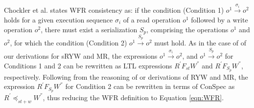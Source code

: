 \documentclass[acmlarge, ,11pt]{acmart}
\begin{document}
\par  Chockler et al. states WFR consistency as: if the condition (Condition 1)
  $\mathit{o}^1 \xrightarrow{\sigma_i} \mathit{o}^2$ holds for a given execution sequence $\sigma_i$ of a read operation
   $\mathit{o}^1$ followed by a write operation  $\mathit{o}^2$, there must exist a serialization ${S_p}$, comprising the
   operations $\mathit{o}^1$ and $\mathit{o}^2$, for which the condition (Condition 2)
  $\mathit{o}^1 \xrightarrow{S_p} \mathit{o}^2$ must hold.
   As in the case of of our derivations for sRYW and MR, the expressions $\mathit{o}^1 \xrightarrow{\sigma_i} \mathit{o}^2$,
  and $\mathit{o}^1 \xrightarrow{S_p} \mathit{o}^2$ for Conditions 1 and 2  can be rewritten as LTL expressions
   $R^{'} F_\mathit{st} W^{''}$ and $R^{'} F_{S_p} W^{''} $, respectively.  %
  Following from the reasoning of or derivations of  RYW and MR, the expression $R^{'}  F_{S_p} W^{''} $ for Condition 2 can be rewritten in terms of ConSpec as  $R^{'}  \preccurlyeq_{\mathit{st}+w} W^{''}$,  thus reducing the WFR definition to Equation \ref{eqn:WFR}.
\end{document}
